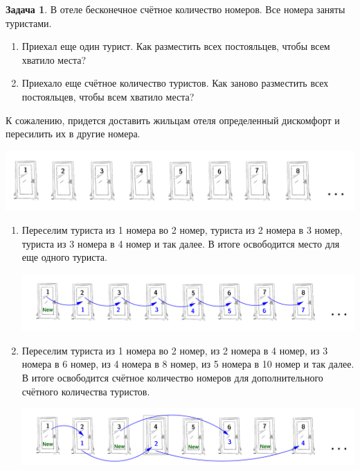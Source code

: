 \documentclass[pdftex, 12pt, a4paper]{article}
\theoremstyle{definition} %
\newtheorem{problem}{Задача}
\numberwithin{problem}{section}
\numberwithin{blits}{section}
\begin{document}
\begin{problem}
В отеле бесконечное счётное количество номеров. Все номера заняты туристами.
\begin{enumerate}
\item Приехал еще один турист. Как разместить всех постояльцев, чтобы всем хватило места?
\item Приехало еще счётное количество туристов. Как заново разместить всех постояльцев, чтобы всем хватило места?
\end{enumerate}
\begin{sol}
К сожалению, придется доставить жильцам отеля определенный дискомфорт и пересилить их в другие номера.

\begin{center}
\includegraphics[scale=1.2]{door1}
\end{center}

\begin{enumerate}
\item Переселим туриста из 1 номера во 2 номер, туриста из 2 номера в 3 номер, туриста из 3 номера в 4 номер и так далее. В итоге освободится место для еще одного туриста.

\begin{center}
\includegraphics[scale=1.2]{door2}
\end{center}

\item Переселим туриста из 1 номера во 2 номер, из 2 номера в 4 номер, из 3 номера в 6 номер, из 4 номера в 8 номер, из 5 номера в 10 номер и так далее. В итоге освободится счётное количество номеров для дополнительного счётного количества туристов.

\begin{center}
\includegraphics[scale=1.2]{door3}
\end{center}


\end{enumerate}
\end{sol}
\end{problem}
\end{document}
